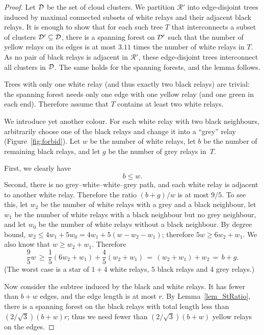 \documentclass[11pt,a4paper]{article}
\newcommand{\myR}{\mathcal{R}}
\theoremstyle{definition}
\theoremstyle{remark}
\begin{document}
\begin{proof}
    Let $\mathcal{D}$ be the set of cloud clusters.  We partition $\myR'$ into edge-disjoint trees induced by maximal connected subsets of white relays and their adjacent black relays. It is enough to show that for each such tree $T$ that interconnects a subset of clusters $\mathcal{D}' \subseteq \mathcal{D}$, there is a spanning forest on $\mathcal{D}'$ such that the number of yellow relays on its edges is at most $3.11$ times the number of white relays in $T$. As no pair of black relays is adjacent in $\myR'$, these edge-disjoint trees interconnect all clusters in $\mathcal{D}$. The same holds for the spanning forests, and the lemma follows.

    Trees with only one white relay (and thus exactly two black relays) are trivial: the spanning forest needs only one edge with one yellow relay (and one green in each end). Therefore assume that $T$ contains at least two white relays.

    We introduce yet another colour. For each white relay with two black neighbours, arbitrarily choose one of the black relays and change it into a ``grey'' relay (Figure~\ref{fig:forbid}). Let $w$ be the number of white relays, let $b$ be the number of remaining black relays, and let $g$ be the number of grey relays in~$T$.

    First, we clearly have
    \begin{equation}\label{eq_yellow_bw}
        b \le w.
    \end{equation}
    Second, there is no grey--white--white--grey path, and each white relay is adjacent to another white relay. Therefore the ratio $(b+g)/w$ is at most $9/5$. To see this, let $w_2$ be the number of white relays with a grey and a black neighbour, let $w_1$ be the number of white relays with a black neighbour but no grey neighbour, and let $w_0$ be the number of white relays without a black neighbour. By degree bound, $w_2 \le 4 w_1 + 5 w_0 = 4 w_1 + 5 (w - w_2 - w_1)$; therefore $5w \ge 6 w_2 + w_1$. We also know that $w \ge w_2 + w_1$. Therefore
\begin{equation}\label{eq_yellow_95wbg}
    \frac95 w
    \,\ge\, \frac15 (6 w_2 + w_1) + \frac45 (w_2 + w_1)
    \,=\, (w_2 + w_1) + w_2
    \,=\, b + g.
\end{equation}
(The worst case is a star of $1+4$ white relays, $5$ black relays and $4$ grey relays.)

    Now consider the subtree induced by the black and white relays. It has fewer than $b+w$ edges, and the edge length is at most $r$. By Lemma~\ref{lem_StRatio}, there is a spanning forest on the black relays with total length less than ${(2/\sqrt{3})(b+w)r}$; thus we need fewer than ${(2/\sqrt{3})(b+w)}$ yellow relays on the edges.


\end{proof}
\end{document}
